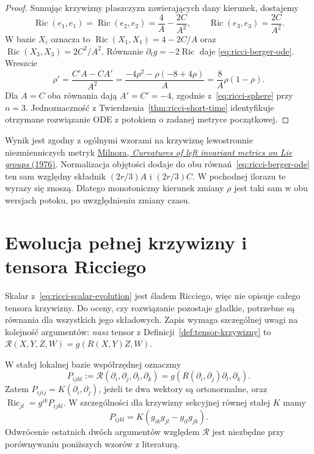 \begin{proof}
Sumując
krzywizny płaszczyzn zawierających dany kierunek,
dostajemy
\[
 \operatorname{Ric}(e_1,e_1)
 =\operatorname{Ric}(e_2,e_2)
 =\frac4A-\frac{2C}{A^2},\qquad
 \operatorname{Ric}(e_3,e_3)=\frac{2C}{A^2}.
\]
W bazie $X_i$ oznacza to
$\operatorname{Ric}(X_1,X_1)=4-2C/A$
oraz $\operatorname{Ric}(X_3,X_3)=2C^2/A^2$.
Równanie $\partial_tg=-2\operatorname{Ric}$ daje
\eqref{eq:ricci-berger-ode}. Wreszcie
\[
 \rho'=\frac{C'A-CA'}{A^2}
 =\frac{-4\rho^2-\rho(-8+4\rho)}{A}
 =\frac8A\rho(1-\rho).
\]
Dla $A=C$ oba równania dają $A'=C'=-4$,
zgodnie z~\eqref{eq:ricci-sphere} przy $n=3$.
Jednoznaczność z Twierdzenia~\ref{thm:ricci-short-time}
identyfikuje otrzymane rozwiązanie ODE z potokiem
o zadanej metryce początkowej.
\end{proof}

Wynik jest zgodny z ogólnymi wzorami na krzywiznę
lewostronnie niezmienniczych metryk
\href{https://doi.org/10.1016/S0001-8708(76)80002-3}
{Milnora, \emph{Curvatures of left invariant metrics
on Lie groups} (1976)}. Normalizacja objętości
dodaje do obu równań~\eqref{eq:ricci-berger-ode}
ten sam względny składnik $(2r/3)A$ i $(2r/3)C$.
W pochodnej ilorazu te wyrazy się znoszą. Dlatego
monotoniczny kierunek zmiany $\rho$ jest taki sam
w obu wersjach potoku, po uwzględnieniu zmiany czasu.

\section{Ewolucja pełnej krzywizny i tensora Ricciego}
\label{sec:ricci-tensor-evolution}

Skalar z~\eqref{eq:ricci-scalar-evolution} jest śladem
Ricciego, więc nie opisuje całego tensora krzywizny.
Do oceny, czy rozwiązanie pozostaje gładkie, potrzebne
są równania dla wszystkich jego składowych. Zapis
wymaga szczególnej uwagi na kolejność argumentów:
\emph{nasz} tensor z Definicji~\ref{def:tensor-krzywizny}
to $\mathcal R(X,Y,Z,W)=g(R(X,Y)Z,W)$.

W stałej lokalnej bazie współrzędnej oznaczmy
\begin{equation}\label{eq:ricci-P-convention}
 P_{ijkl}:=\mathcal R(\partial_i,\partial_j,
                          \partial_l,\partial_k)
          =g(R(\partial_i,\partial_j)\partial_l,\partial_k).
\end{equation}
Zatem $P_{ijij}=K(\partial_i,\partial_j)$, jeżeli
te dwa wektory są ortonormalne, oraz
$\operatorname{Ric}_{jl}=g^{ik}P_{ijkl}$.
W szczególności dla krzywizny sekcyjnej równej
stałej $K$ mamy
\begin{equation}\label{eq:ricci-P-constant-curvature}
 P_{ijkl}=K(g_{ik}g_{jl}-g_{il}g_{jk}).
\end{equation}
Odwrócenie ostatnich dwóch argumentów względem
$\mathcal R$ jest niezbędne przy porównywaniu poniższych
wzorów z literaturą.


